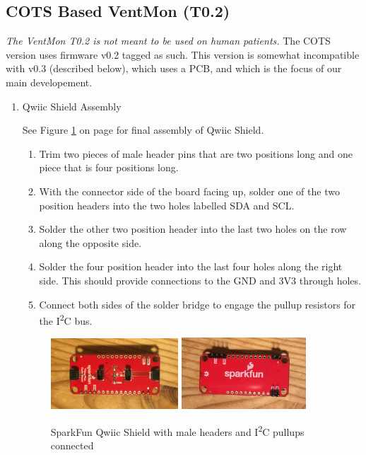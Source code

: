 \documentclass[11pt, letterpaper]{article}
\begin{document}
\subsection{COTS Based VentMon (T0.2)}

{\em The VentMon T0.2 is not meant to be used on human patients. } The COTS version uses firmware v0.2 tagged as such\cite{VentMon02}. This version is somewhat incompatible
with v0.3 (described below), which uses a PCB, and which is
the focus of our main developement.

\begin{enumerate}

\item
Qwiic Shield Assembly

See Figure \ref{fig:qwiic} on page \pageref{fig:qwiic} for final assembly of Qwiic Shield.

\begin{enumerate}[label=1.\arabic*]
\item
Trim two pieces of male header pins that are two positions long and one piece that is four positions long.
\item
With the connector side of the board facing up, solder one of the two position headers into the two holes labelled SDA and SCL.
\item
Solder the other two position header into the last two holes on the row along the opposite side.
\item
Solder the four position header into the last four holes along the right side. This should provide connections to the GND and 3V3 through holes.
\item
Connect both sides of the solder bridge to engage the pullup resistors for the I\textsuperscript{2}C bus.
\end{enumerate}

\begin{figure}[H]
\centering
\includegraphics[width=0.45\textwidth]{images/qwiic_top.JPG}
\includegraphics[width=0.44\textwidth]{images/qwiic_bottom.JPG}
\caption{SparkFun Qwiic Shield with male headers and I\textsuperscript{2}C pullups connected}
\label{fig:qwiic}
\end{figure}


\end{enumerate}
\end{document}
